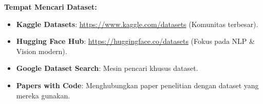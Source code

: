 \begin{tipbox}
    \textbf{Tempat Mencari Dataset:}
    \begin{itemize}
        \item \textbf{Kaggle Datasets}: \url{https://www.kaggle.com/datasets} (Komunitas terbesar).
        \item \textbf{Hugging Face Hub}: \url{https://huggingface.co/datasets} (Fokus pada NLP \& Vision modern).
        \item \textbf{Google Dataset Search}: Mesin pencari khusus dataset.
        \item \textbf{Papers with Code}: Menghubungkan paper penelitian dengan dataset yang mereka gunakan.
    \end{itemize}
\end{tipbox}
